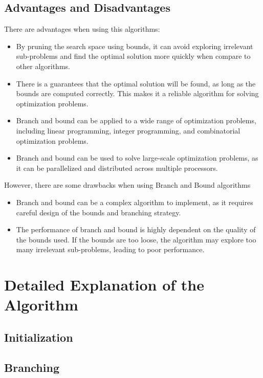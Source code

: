 \documentclass[a4paper]{article}
\begin{document}
\subsection{Advantages and Disadvantages}
There are advantages when using this algorithms:
\begin{itemize}
    \item By pruning the search space using bounds, it can avoid exploring irrelevant sub-problems and find the optimal solution more quickly when compare to other algorithms.
    \item There is a guarantees that the optimal solution will be found, as long as the bounds are computed correctly. This makes it a reliable algorithm for solving optimization problems.
    \item Branch and bound can be applied to a wide range of optimization problems, including linear programming, integer programming, and combinatorial optimization problems.
    \item  Branch and bound can be used to solve large-scale optimization problems, as it can be parallelized and distributed across multiple processors.
\end{itemize}
However, there are some drawbacks when using Branch and Bound algorithms
\begin{itemize}
    \item Branch and bound can be a complex algorithm to implement, as it requires careful design of the bounds and branching strategy.
    \item The performance of branch and bound is highly dependent on the quality of the bounds used. If the bounds are too loose, the algorithm may explore too many irrelevant sub-problems, leading to poor performance.
\end{itemize}
\section{Detailed Explanation of the Algorithm}
\subsection{Initialization}
\subsection{Branching}
\end{document}

